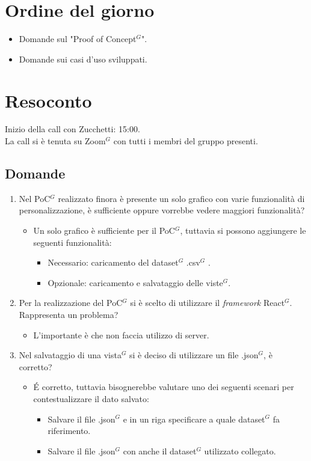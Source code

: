 \section{Ordine del giorno}

\begin{itemize}
	\item Domande sul "Proof of Concept$^{G}$".
	\item Domande sui casi d'uso sviluppati.
\end{itemize}

\section{Resoconto}
\label{sec:Resoconto}

\noindent 
Inizio della call con Zucchetti: 15:00. \\
\noindent La call si è tenuta su Zoom$^{G}$ con tutti i membri del gruppo presenti.

\subsection{Domande}
\begin{enumerate}
	\item Nel PoC$^{G}$ realizzato finora è presente un solo grafico con varie funzionalità di personalizzazione, è sufficiente oppure vorrebbe vedere maggiori funzionalità?
	\begin{itemize}
		\item Un solo grafico è sufficiente per il PoC$^{G}$, tuttavia si possono aggiungere le seguenti funzionalità:
		\begin{itemize}
			\item Necessario: caricamento del dataset$^{G}$ .csv$^{G}$ .
			\item Opzionale: caricamento e salvataggio delle viste$^{G}$.
		\end{itemize}
	\end{itemize}
	\item Per la realizzazione del PoC$^{G}$ si è scelto di utilizzare il \textit{framework} React$^{G}$. Rappresenta un problema?
	\begin{itemize}
		\item L'importante è che non faccia utilizzo di server.
	\end{itemize}
	\item Nel salvataggio di una vista$^{G}$ si è deciso di utilizzare un file .json$^{G}$, è corretto?
	\begin{itemize}
		\item \' E corretto, tuttavia bisognerebbe valutare uno dei seguenti scenari per contestualizzare il dato salvato:
		\begin{itemize}
			\item Salvare il file .json$^{G}$ e in un riga specificare a quale dataset$^{G}$ fa riferimento.
			\item Salvare il file .json$^{G}$ con anche il dataset$^{G}$ utilizzato collegato.
		\end{itemize}
	\end{itemize}
\end{enumerate}

